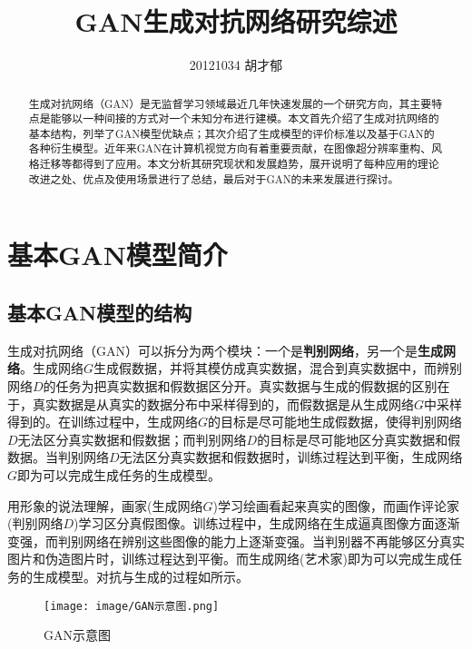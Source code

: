 \documentclass[lang=cn,a4paper,12pt,bibend=biber]{GAN}
\title{GAN生成对抗网络研究综述}
\author{20121034 胡才郁}
\institute{\href{https://cs.shu.edu.cn/}{计算机工程与科学学院}}
\date{\zhtoday}
\begin{document}
\maketitle

\begin{abstract}
  生成对抗网络（GAN）是无监督学习领域最近几年快速发展的一个研究方向，其主要特点是能够以一种间接的方式对一个未知分布进行建模。本文首先介绍了生成对抗网络的基本结构，列举了GAN模型优缺点；其次介绍了生成模型的评价标准以及基于GAN的各种衍生模型。近年来GAN在计算机视觉方向有着重要贡献，在图像超分辨率重构、风格迁移等都得到了应用。本文分析其研究现状和发展趋势，展开说明了每种应用的理论改进之处、优点及使用场景进行了总结，最后对于GAN的未来发展进行探讨。
\end{abstract}

\section{基本GAN模型简介}

\subsection{基本GAN模型的结构}

生成对抗网络（GAN）可以拆分为两个模块：一个是\textbf{判别网络}，另一个是\textbf{生成网络}。生成网络$G$生成假数据，并将其模仿成真实数据，混合到真实数据中，而辨别网络$D$的任务为把真实数据和假数据区分开。真实数据与生成的假数据的区别在于，真实数据是从真实的数据分布中采样得到的，而假数据是从生成网络$G$中采样得到的。在训练过程中，生成网络$G$的目标是尽可能地生成假数据，使得判别网络$D$无法区分真实数据和假数据；而判别网络$D$的目标是尽可能地区分真实数据和假数据。当判别网络$D$无法区分真实数据和假数据时，训练过程达到平衡，生成网络$G$即为可以完成生成任务的生成模型。

用形象的说法理解，画家(生成网络$G$)学习绘画看起来真实的图像，而画作评论家(判别网络$D$)学习区分真假图像。训练过程中，生成网络在生成逼真图像方面逐渐变强，而判别网络在辨别这些图像的能力上逐渐变强。当判别器不再能够区分真实图片和伪造图片时，训练过程达到平衡。而生成网络(艺术家)即为可以完成生成任务的生成模型。对抗与生成的过程如所示。

\begin{figure}[!htbp]
  \centering
  \texttt{[image: image/GAN示意图.png]}
  \caption[]{GAN示意图}
  \label{fig:GAN示意图}
\end{figure}
\end{document}
